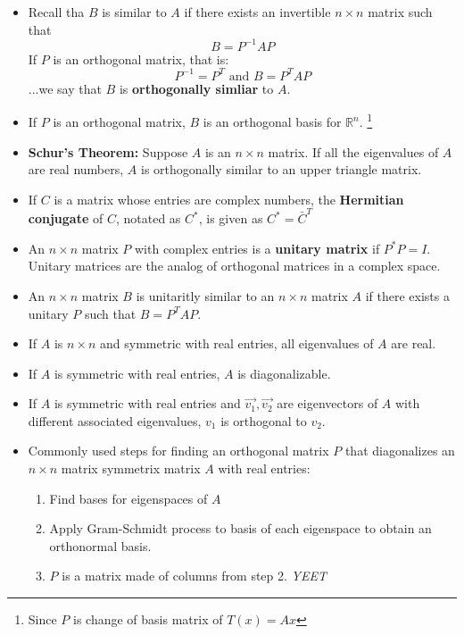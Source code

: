 \documentclass[10pt,letterpaper]{article}
\begin{document}
\begin{itemize}

\item Recall tha $B$ is similar to $A$ if there exists an invertible $n\times n$ matrix such that $$B=P^{-1}AP$$
If $P$ is an orthogonal matrix, that is: 
$$P^{-1}=P^T \mbox{ and } B=P^TAP$$ 
...we say that $B$ is \textbf{orthogonally simliar} to $A$. 

\item If $P$ is an orthogonal matrix, $B$ is an orthogonal basis for $\mathbb{R}^n. $ \footnote{Since $P$ is change of basis matrix of $T(x)=Ax$}

\item \textbf{Schur's Theorem:} Suppose $A$ is an $n\times n$ matrix. If all the eigenvalues of $A$ are real numbers, $A$ is orthogonally similar to an upper triangle matrix. 

\item If $C$ is a matrix whose entries are complex numbers, the \textbf{Hermitian conjugate} of $C$, notated as $C^*$, is given as $C^*=\bar{C}^T$

\item An $n \times n$ matrix $P$ with complex entries is a \textbf{unitary matrix }if $P^*P=I$. Unitary matrices are the analog of orthogonal matrices in a complex space. 

\item An $n\times n$ matrix $B$ is unitaritly similar to an $n\times n$ matrix $A$ if there exists a unitary $P$ such that $B=P^TAP$. 

\item If $A$ is $n \times n$ and symmetric with real entries, all eigenvalues of $A$ are real. 

\item If $A$ is symmetric with real entries, $A$ is diagonalizable. 

\item If $A$ is symmetric with real entries and $\vec{v_1},\vec{v_2}$ are eigenvectors of $A$ with different associated eigenvalues, $v_1$ is orthogonal to $v_2$. 

\item Commonly used steps for finding an orthogonal matrix $P$ that diagonalizes an $n\times n$ matrix symmetrix matrix $A$ with real entries: 

\begin{enumerate}
\item Find bases for eigenspaces of $A$
\item Apply Gram-Schmidt process to basis of each eigenspace to obtain an orthonormal basis. 
\item $P$ is a matrix made of columns from step 2. \textit{YEET }
\end{enumerate}


\end{itemize}
\end{document}
